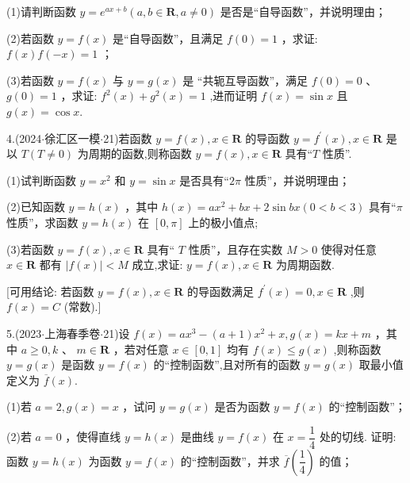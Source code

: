 (1)请判断函数 $y = {{e}}^{{ax} + b}\left( {a,b \in  \mathbf{R},a \neq  0}\right)$ 是否是“自导函数”，并说明理由；

(2)若函数 $y = f\left( x\right)$ 是“自导函数”，且满足 $f\left( 0\right)  = 1$ ，求证: $f\left( x\right) f\left( {-x}\right)  = 1$ ；

(3)若函数 $y = f\left( x\right)$ 与 $y = g\left( x\right)$ 是 “共轭互导函数”，满足 $f\left( 0\right)  = 0$ 、 $g\left( 0\right)  = 1$ ，求证: ${f}^{2}\left( x\right)  +  {g}^{2}\left( x\right)  = 1$ ,进而证明 $f\left( x\right)  = \sin x$ 且 $g\left( x\right)  = \cos x$.

4.(2024$\cdot$徐汇区一模$\cdot$21)若函数 $y = f\left( x\right) ,x \in  \mathbf{R}$ 的导函数 $y = {f}^{\prime }\left( x\right) ,x \in  \mathbf{R}$ 是以 $T\left( {T \neq  0}\right)$ 为周期的函数,则称函数 $y = f\left( x\right) ,x \in  \mathbf{R}$ 具有“$T$ 性质”.

(1)试判断函数 $y = {x}^{2}$ 和 $y = \sin x$ 是否具有“${2\pi }$ 性质”，并说明理由；

(2)已知函数 $y = h\left( x\right)$ ，其中 $h\left( x\right)  = a{x}^{2} + {bx} + 2\sin {bx}\left( {0 < b < 3}\right)$ 具有“$\pi$ 性质”，求函数 $y = h\left( x\right)$ 在 $\left\lbrack  {0,\pi }\right\rbrack$ 上的极小值点;

(3)若函数 $y = f\left( x\right) ,x \in  \mathbf{R}$ 具有“ $T$ 性质”，且存在实数 $M > 0$ 使得对任意 $x \in  \mathbf{R}$ 都有 $\left| {f\left( x\right) }\right|  < M$ 成立,求证: $y = f\left( x\right) ,x \in  \mathbf{R}$ 为周期函数.

[可用结论: 若函数 $y = f\left( x\right) ,x \in  \mathbf{R}$ 的导函数满足 ${f}^{\prime }\left( x\right)  = 0,x \in  \mathbf{R}$ ,则 $f\left( x\right)  = C$ (常数).]

5.(2023$\cdot$上海春季卷$\cdot$21)设 $f\left( x\right)  = a{x}^{3} - \left( {a + 1}\right) {x}^{2} + x,g\left( x\right)  = {kx} + m$ ，其中 $a \geq  0,k$ 、 $m \in  \mathbf{R}$ ，若对任意 $x \in  \left\lbrack  {0,1}\right\rbrack$ 均有 $f\left( x\right)  \leq  g\left( x\right)$ ,则称函数 $y = g\left( x\right)$ 是函数 $y = f\left( x\right)$ 的“控制函数”,且对所有的函数 $y = g\left( x\right)$ 取最小值定义为 $\overline{f}\left( x\right)$.

(1)若 $a = 2,g\left( x\right)  = x$ ，试问 $y = g\left( x\right)$ 是否为函数 $y = f\left( x\right)$ 的“控制函数”；

(2)若 $a = 0$ ，使得直线 $y = h\left( x\right)$ 是曲线 $y = f\left( x\right)$ 在 $x = \dfrac{1}{4}$ 处的切线. 证明:函数 $y = h\left( x\right)$ 为函数 $y = f\left( x\right)$ 的“控制函数”，并求 $\overline{f}\left( \dfrac{1}{4}\right)$ 的值；

